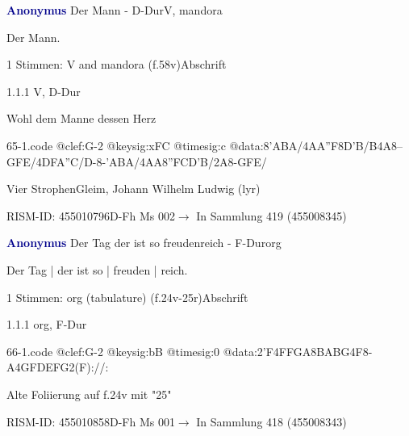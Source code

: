 \documentclass[twocolumn]{book}
\begin{document}
\par \vspace{7pt} \textcolor{darkblue}{\textbf{Anonymus  }}\hfillplus{\textbf{[65]}}\newline Der Mann - D-Dur\newline V, mandora
\par \begin{itshape}[heading, f.58v:] Der Mann.\end{itshape} 
\par \textcolor{darkblue}{}  1 Stimmen: V and mandora  (f.58v)\newline Abschrift
\par 1.1.1  V, D-Dur\newline \begin{footnotesize} Wohl dem Manne dessen Herz \end{footnotesize}  
\begin{filecontents*}{65-1.code}
@clef:G-2
@keysig:xFC
@timesig:c
@data:8'ABA/4AA''F8D'B/B4A8--GFE/4DFA''C/D-8-'ABA/4AA{8''FC}{D'B}/2A8-GFE/
\end{filecontents*}
\newline
%
\par Vier Strophen\newline Gleim, Johann Wilhelm Ludwig  (lyr)
\par RISM-ID: 455010796\newline D-Fh  Ms 002\newline $\rightarrow$ In Sammlung 419 (455008345)
      
\par \vspace{7pt} \textcolor{darkblue}{\textbf{Anonymus  }}\hfillplus{\textbf{[66]}}\newline Der Tag der ist so freudenreich - F-Dur\newline org
\par \begin{itshape}[f.25r, at left:] Der Tag | der ist so | freuden | reich.\end{itshape} 
\par \textcolor{darkblue}{}  1 Stimmen: org (tabulature)  (f.24v-25r)\newline Abschrift
\par 1.1.1  org, F-Dur  
\begin{filecontents*}{66-1.code}
@clef:G-2
@keysig:bB
@timesig:0
@data:2'F4FFGA{8BABG}4F8-A4GFDEFG2(F)://:
\end{filecontents*}
\newline
%
\par Alte Foliierung auf f.24v mit "25"
\par RISM-ID: 455010858\newline D-Fh  Ms 001\newline $\rightarrow$ In Sammlung 418 (455008343)
      
\end{document}
